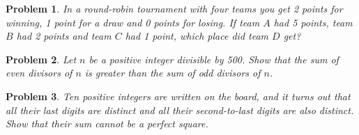 \documentclass[a4paper,12pt]{article}
\theoremstyle{perfect}
\newtheorem{prb}{Problem}
\begin{document}
\begin{prb}
In a round-robin tournament with four teams you get 2 points for winning, 1 point for a draw and 0 points for losing. If team $A$ had 5 points, team $B$ had 2 points and team $C$ had 1 point, which place did team $D$ get?
\end{prb}

\begin{prb}
Let $n$ be a positive integer divisible by 500. Show that the sum of even divisors of $n$ is greater than the sum of odd divisors of $n$. 
\end{prb}

\begin{prb}
Ten positive integers are written on the board, and it turns out that all their last digits are distinct and all their second-to-last digits are also distinct. Show that their sum cannot be a perfect square. 
\end{prb}
\end{document}
